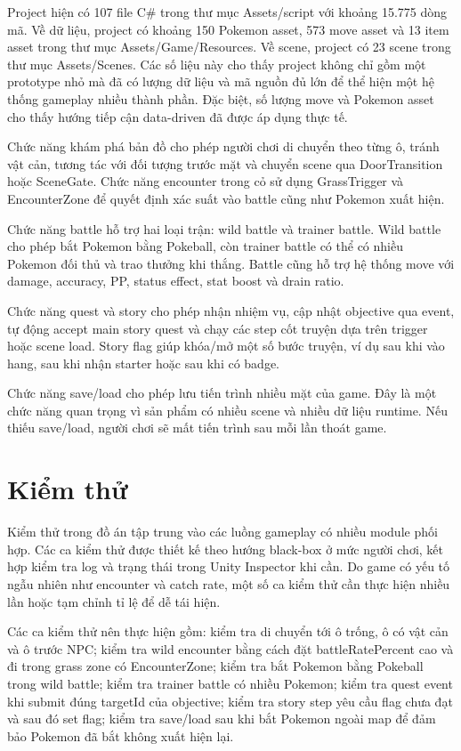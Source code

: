 Project hiện có 107 file C\# trong thư mục Assets/script với khoảng 15.775 dòng mã. Về dữ liệu, project có khoảng 150 Pokemon asset, 573 move asset và 13 item asset trong thư mục Assets/Game/Resources. Về scene, project có 23 scene trong thư mục Assets/Scenes. Các số liệu này cho thấy project không chỉ gồm một prototype nhỏ mà đã có lượng dữ liệu và mã nguồn đủ lớn để thể hiện một hệ thống gameplay nhiều thành phần. Đặc biệt, số lượng move và Pokemon asset cho thấy hướng tiếp cận data-driven đã được áp dụng thực tế.

Chức năng khám phá bản đồ cho phép người chơi di chuyển theo từng ô, tránh vật cản, tương tác với đối tượng trước mặt và chuyển scene qua DoorTransition hoặc SceneGate. Chức năng encounter trong cỏ sử dụng GrassTrigger và EncounterZone để quyết định xác suất vào battle cũng như Pokemon xuất hiện.

Chức năng battle hỗ trợ hai loại trận: wild battle và trainer battle. Wild battle cho phép bắt Pokemon bằng Pokeball, còn trainer battle có thể có nhiều Pokemon đối thủ và trao thưởng khi thắng. Battle cũng hỗ trợ hệ thống move với damage, accuracy, PP, status effect, stat boost và drain ratio.

Chức năng quest và story cho phép nhận nhiệm vụ, cập nhật objective qua event, tự động accept main story quest và chạy các step cốt truyện dựa trên trigger hoặc scene load. Story flag giúp khóa/mở một số bước truyện, ví dụ sau khi vào hang, sau khi nhận starter hoặc sau khi có badge.

Chức năng save/load cho phép lưu tiến trình nhiều mặt của game. Đây là một chức năng quan trọng vì sản phẩm có nhiều scene và nhiều dữ liệu runtime. Nếu thiếu save/load, người chơi sẽ mất tiến trình sau mỗi lần thoát game.

\section{Kiểm thử}

Kiểm thử trong đồ án tập trung vào các luồng gameplay có nhiều module phối hợp. Các ca kiểm thử được thiết kế theo hướng black-box ở mức người chơi, kết hợp kiểm tra log và trạng thái trong Unity Inspector khi cần. Do game có yếu tố ngẫu nhiên như encounter và catch rate, một số ca kiểm thử cần thực hiện nhiều lần hoặc tạm chỉnh tỉ lệ để dễ tái hiện.

Các ca kiểm thử nên thực hiện gồm: kiểm tra di chuyển tới ô trống, ô có vật cản và ô trước NPC; kiểm tra wild encounter bằng cách đặt battleRatePercent cao và đi trong grass zone có EncounterZone; kiểm tra bắt Pokemon bằng Pokeball trong wild battle; kiểm tra trainer battle có nhiều Pokemon; kiểm tra quest event khi submit đúng targetId của objective; kiểm tra story step yêu cầu flag chưa đạt và sau đó set flag; kiểm tra save/load sau khi bắt Pokemon ngoài map để đảm bảo Pokemon đã bắt không xuất hiện lại.

